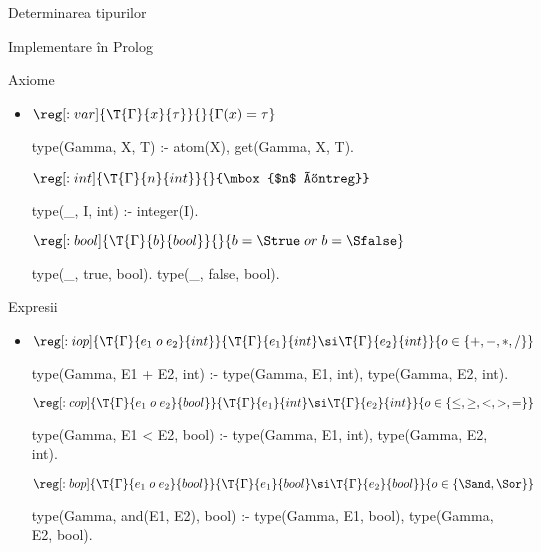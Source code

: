 \documentclass[xcolor=x11names,compress,10pt]{beamer}
\begin{document}
\begin{section}{Determinarea tipurilor}
\begin{subsection}{Implementare în Prolog}
    \begin{frame}[fragile]{Axiome}
    \begin{itemize}
    \item[] $\reg[:var]{\T{\Gamma}{x}{\tau}}{}{\Gamma(x) = \tau}$

    \begin{asciipl}
      type(Gamma, X, T) :- atom(X), get(Gamma, X, T).
    \end{asciipl}

    \vitem[] $\reg[:int]{\T{\Gamma}{n}{int}}{}{\mbox{$n$ întreg}}$

    \begin{asciipl}
      type(_, I, int) :- integer(I).
    \end{asciipl}

    \vitem[] $\reg[:bool]{\T{\Gamma}{b}{bool}}{}{b = \Strue \mathrel{or} b = \Sfalse}$

    \begin{asciipl}
      type(_, true, bool).
      type(_, false, bool).
    \end{asciipl}
    \end{itemize}
    \end{frame}
    
    
    \begin{frame}[fragile]{Expresii}
    \begin{itemize}
    \item[]
    $\reg[:iop]{\T{\Gamma}{e_1\mathrel{o} e_2}{int}}{\T{\Gamma}{e_1}{int} \si \T{\Gamma}{e_2}{int}}{o\in \{+,-,*,/\}}$

    \begin{asciipl}
type(Gamma, E1 + E2, int) :-
    type(Gamma, E1, int), type(Gamma, E2, int).
    \end{asciipl}
    
    \vitem[]
    $\reg[:cop]{\T{\Gamma}{e_1\mathrel{o} e_2}{bool}}{\T{\Gamma}{e_1}{int} \si \T{\Gamma}{e_2}{int}}{o\in \{\leq, \geq, <, >, =\}}$

    \begin{asciipl}
type(Gamma, E1 < E2, bool) :-
    type(Gamma, E1, int), type(Gamma, E2, int).
    \end{asciipl}
    
    \vitem[]
    $\reg[:bop]{\T{\Gamma}{e_1\mathrel{o} e_2}{bool}}{\T{\Gamma}{e_1}{bool} \si \T{\Gamma}{e_2}{bool}}{o\in \{\Sand, \Sor\}}$

    \begin{asciipl}
type(Gamma, and(E1, E2), bool) :-
    type(Gamma, E1, bool), type(Gamma, E2, bool).
    \end{asciipl}
    \end{itemize}
    \end{frame}


\end{subsection}
\end{section}
\end{document}
